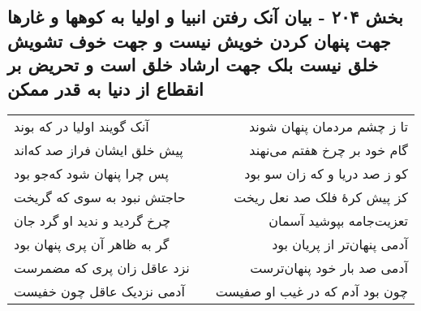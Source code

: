 \begin{center}
\section*{بخش ۲۰۴ - بیان آنک رفتن انبیا و اولیا به کوهها و غارها جهت پنهان کردن خویش نیست و جهت خوف تشویش خلق نیست بلک جهت ارشاد خلق است و تحریض بر انقطاع از دنیا  به قدر ممکن}
\label{sec:sh204}
\begin{longtable}{l p{0.5cm} r}
آنک گویند اولیا در که بوند
&&
تا ز چشم مردمان پنهان شوند
\\
پیش خلق ایشان فراز صد که‌اند
&&
گام خود بر چرخ هفتم می‌نهند
\\
پس چرا پنهان شود که‌جو بود
&&
کو ز صد دریا و که زان سو بود
\\
حاجتش نبود به سوی که گریخت
&&
کز پیش کرهٔ فلک صد نعل ریخت
\\
چرخ گردید و ندید او گرد جان
&&
تعزیت‌جامه بپوشید آسمان
\\
گر به ظاهر آن پری پنهان بود
&&
آدمی پنهان‌تر از پریان بود
\\
نزد عاقل زان پری که مضمرست
&&
آدمی صد بار خود پنهان‌ترست
\\
آدمی نزدیک عاقل چون خفیست
&&
چون بود آدم که در غیب او صفیست
\\
\end{longtable}
\end{center}
